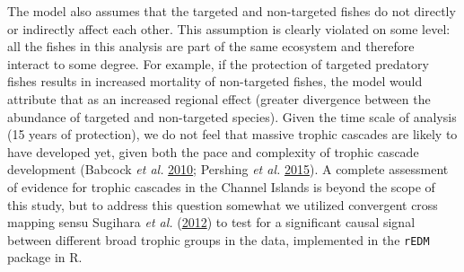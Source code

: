\documentclass[twoside,12pt,final]{ucthesis-CA2012}
\begin{document}
\begin{ucmainmatter}
The model also assumes that the targeted and non-targeted fishes do not
directly or indirectly affect each other. This assumption is clearly
violated on some level: all the fishes in this analysis are part of the
same ecosystem and therefore interact to some degree. For example, if
the protection of targeted predatory fishes results in increased
mortality of non-targeted fishes, the model would attribute that as an
increased regional effect (greater divergence between the abundance of
targeted and non-targeted species). Given the time scale of analysis (15
years of protection), we do not feel that massive trophic cascades are
likely to have developed yet, given both the pace and complexity of
trophic cascade development (Babcock \emph{et al.}
\protect\hyperlink{ref-Babcock2010}{2010}; Pershing \emph{et al.}
\protect\hyperlink{ref-Pershing2015a}{2015}). A complete assessment of
evidence for trophic cascades in the Channel Islands is beyond the scope
of this study, but to address this question somewhat we utilized
convergent cross mapping sensu Sugihara \emph{et al.}
(\protect\hyperlink{ref-Sugihara2012}{2012}) to test for a significant
causal signal between different broad trophic groups in the data,
implemented in the \texttt{rEDM} package in R.


\end{ucmainmatter}
\end{document}
